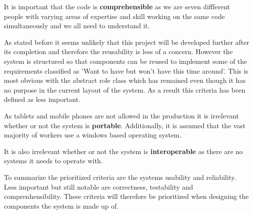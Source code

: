 It is important that the code is \textbf{comprehensible} as we are seven diffferent people with varying areas of expertise and skill working on the same code simultaneously and we all need to understand it.

As stated before it seems unlikely that this project will be developed further after its completion and therefore the reusability is less of a concern. However the system is structured so that components can be reused to implement some of the requirements classified as 'Want to have but won't have this time around'. This is most obvious with the abstract role class which has remained even though it has no purpose in the current layout of the system. As a result this criteria has been defined as less important.

As tablets and mobile phones are not allowed in the production it is irrelevant whether or not the system is \textbf{portable}. Additionally, it is assumed that the vast majority of workers use a windows based operating system.

It is also irrelevant whether or not the system is \textbf{interoperable} as there are no systems it needs to operate with.

To summarize the prioritized criteria are the systems usability and reliability. Less important but still notable are correctness, testability and comprenhensibility. These criteria will therefore be prioritized when designing the components the system is made up of.
